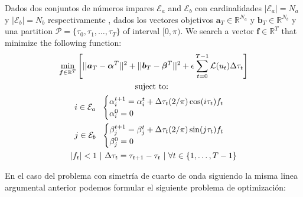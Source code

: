 \begin{problem}
    Dados dos conjuntos de números impares $\mathcal{E}_a$ and $\mathcal{E}_b$ con cardinalidades $|\mathcal{E}_a| = N_a$ y  $|\mathcal{E}_b| = N_b$ respectivamente , dados los vectores objetivos $\bm{a}_T  \in \mathbb{R}^{N_a}$ y $\bm{b}_T  \in \mathbb{R}^{N_b}$ y una  partition $\mathcal{P} = \{\tau_0,\tau_1,\dots,\tau_{T}\}$ of interval $[0,\pi)$. We search a vector $\bm{f} \in \mathbb{R}^{T}$ that minimize the following function:
    \begin{gather}
        \min_{\bm{f} \in \mathbb{R}^{T} } 
        \Bigg[ 
        || \bm{a}_T - \bm{\alpha}^{T}||^2 + 
        || \bm{b}_T - \bm{\beta}^{T}||^2 
        + \epsilon  \sum_{t=0}^{T-1} \mathcal{L}(u_{t}) \Delta\tau_t  \Bigg]  \\
        \notag \text{suject to: } \\
        \notag i \in \mathcal{E}_a \ \ 
        \begin{cases}
            \alpha_i^{t+1} = \alpha_i^{t} + \Delta \tau_t (2/\pi) \cos(i\tau_t) f_t \\
            \alpha_i^0 = 0
        \end{cases} \\
        \notag j \in \mathcal{E}_b \ \ 
        \begin{cases}
            \beta_j^{t+1} = \beta_j^{t} + \Delta \tau_t (2/\pi) \sin(j\tau_t) f_t \\
            \beta_j^0 = 0
        \end{cases} \\
        \notag |f_t| < 1 \ | \  \Delta \tau_t = \tau_{t+1} - \tau_{t} \ | \ \forall t \in \{1,\dots,T-1\}
    \end{gather}
\end{problem}


En el caso del problema con simetría de cuarto de onda siguiendo la misma linea argumental anterior podemos formular el siguiente problema de optimización:

